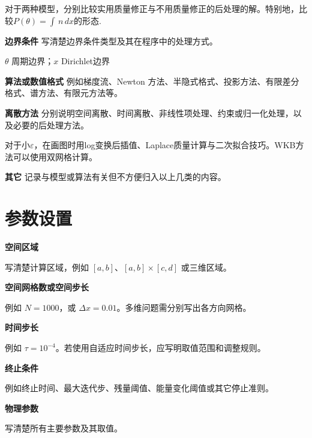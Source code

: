 \documentclass[UTF8,a4paper,11pt]{ctexart}
\newcommand{\hint}[1]{{\small\color{midgray}#1}\par}
\begin{document}
对于两种模型，分别比较实用质量修正与不用质量修正的后处理的解。特别地，比较$P(\theta)=\int \, n \, dx$的形态. 
\vspace{1.0em}

\noindent\textbf{边界条件}
\hint{写清楚边界条件类型及其在程序中的处理方式。}

$\theta$ 周期边界；$x$ Dirichlet边界
\vspace{1.0em}

\noindent\textbf{算法或数值格式}
\hint{例如梯度流、Newton 方法、半隐式格式、投影方法、有限差分格式、谱方法、有限元方法等。}
\vspace{1.0em}

\noindent\textbf{离散方法}
\hint{分别说明空间离散、时间离散、非线性项处理、约束或归一化处理，以及必要的后处理方法。}
对于小$\varepsilon$，在画图时用log变换后插值、Laplace质量计算与二次拟合技巧。WKB方法可以使用双网格计算。

\vspace{1.0em}

\noindent\textbf{其它}
\hint{记录与模型或算法有关但不方便归入以上几类的内容。}
\vspace{1.0em}


\section{参数设置}

\noindent\textbf{空间区域}\par
\hint{写清楚计算区域，例如 $[a,b]$、$[a,b]\times[c,d]$ 或三维区域。}
\vspace{1.0em}

\noindent\textbf{空间网格数或空间步长}\par
\hint{例如 $N=1000$，或 $\Delta x=0.01$。多维问题需分别写出各方向网格。}
\vspace{1.0em}

\noindent\textbf{时间步长}\par
\hint{例如 $\tau=10^{-4}$。若使用自适应时间步长，应写明取值范围和调整规则。}
\vspace{1.0em}

\noindent\textbf{终止条件}\par
\hint{例如终止时间、最大迭代步、残量阈值、能量变化阈值或其它停止准则。}
\vspace{1.0em}

\noindent\textbf{物理参数}\par
\hint{写清楚所有主要参数及其取值。}
\vspace{1.2em}
\end{document}
